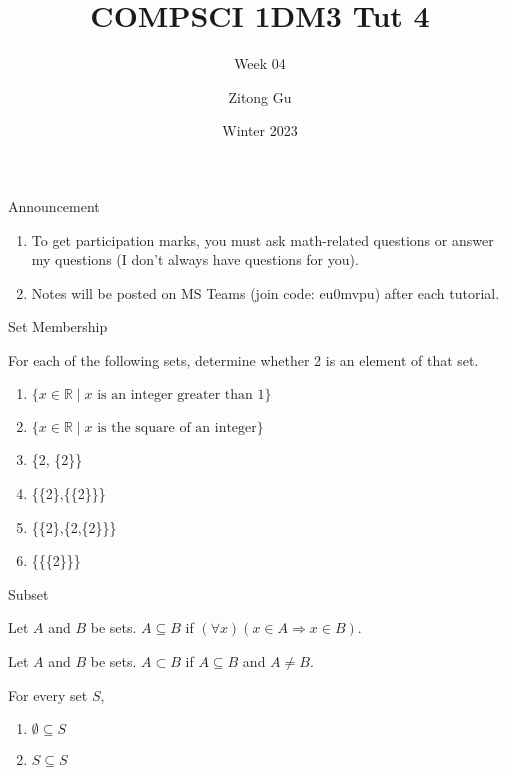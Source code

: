 \documentclass{beamer}
\title{COMPSCI 1DM3 Tut 4}
\subtitle{Week 04}
\author{Zitong Gu}
\institute{McMaster University}
\date{Winter 2023}
\begin{document}
\frame{\titlepage}

\begin{frame}{Announcement}
    \begin{enumerate}
        \item To get participation marks, you must ask math-related questions or answer my questions (I don't always have questions for you).
        \item Notes will be posted on MS Teams (join code: eu0mvpu) after each tutorial. 
    \end{enumerate}
\end{frame}

\begin{frame}{Set Membership}
    \begin{example}
        For each of the following sets, determine whether 2 is an element of that set.
        \begin{enumerate}
            \item $\{ x \in \mathbb{R} \mid x \text{ is an integer greater than } 1\}$
            \item $\{ x \in \mathbb{R} \mid x \text{ is the square of an integer}\}$
            \item \{2, \{2\}\}
            \item \{\{2\},\{\{2\}\}\}
            \item \{\{2\},\{2,\{2\}\}\}
            \item \{\{\{2\}\}\}
        \end{enumerate}
    \end{example}
\end{frame}

\begin{frame}[t]{Subset}
    \begin{definition}
        Let $A$ and $B$ be sets. $A \subseteq B$ if $(\forall x)(x \in A \Rightarrow x \in B)$.
    \end{definition}
    \begin{definition}
        Let $A$ and $B$ be sets. $A \subset B$ if $A \subseteq B$ and $A \neq B$.
    \end{definition}
    \begin{theorem}
        For every set $S$, \begin{enumerate}
            \item $\emptyset \subseteq S$
            \item $S \subseteq S$
        \end{enumerate}
    \end{theorem}
\end{frame}
\end{document}
